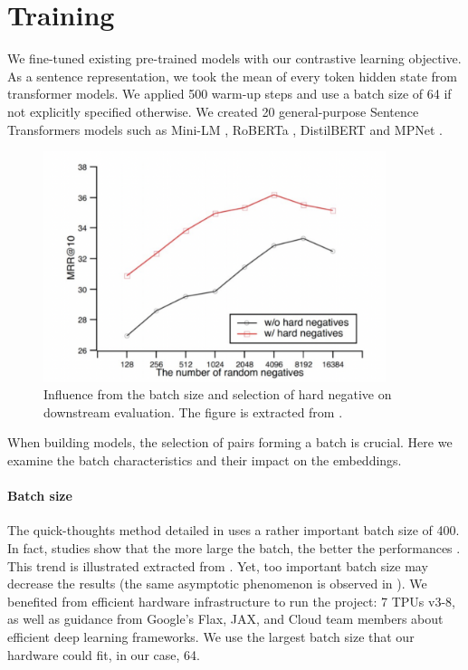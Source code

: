 \section{Training}

We fine-tuned existing pre-trained models with our contrastive learning objective. As a sentence representation, we took the mean of every token hidden state from transformer models. We applied 500 warm-up steps and use a batch size of 64 if not explicitly specified otherwise. We created 20 general-purpose Sentence Transformers models such as Mini-LM \parencite{wang_20a}, RoBERTa \parencite{liu_2019}, DistilBERT \parencite{sanh_19} and MPNet \parencite{song_20}. 

\begin{figure}[htb!]
	\includegraphics[width=10cm]{images/batch-size.png}
	\caption[Batch size]{Influence from the batch size and selection of hard negative on downstream evaluation. The figure is extracted from \textcite{qu_21}.}
\end{figure}

When building models, the selection of pairs forming a batch is crucial. Here we examine the batch characteristics and their impact on the embeddings.

\paragraph{Batch size} The quick-thoughts method detailed in  uses a rather important batch size of 400. In fact, studies show that the more large the batch, the better the performances  \parencite{chen_20a, qu_21}. This trend is illustrated  extracted from \textcite{qu_21}. Yet, too important batch size may decrease the results (the same asymptotic phenomenon is observed in \textcite{chen_20a}).  We benefited from efficient hardware infrastructure to run the project: 7 TPUs v3-8, as well as guidance from Google’s Flax, JAX, and Cloud team members about efficient deep learning frameworks. We use the largest batch size that our hardware could fit, in our case, 64.

